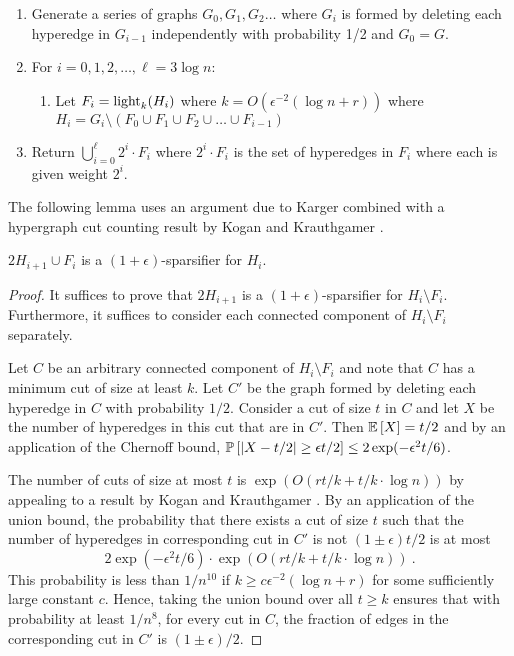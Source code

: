 \begin{enumerate}
\item Generate a series of graphs $G_0, G_1, G_2\ldots $ where $G_i$ is formed by deleting each hyperedge in $G_{i-1}$ independently with probability 1/2 and $G_0=G$.
\item For $i=0,1,2,\ldots, \ell=3\log n$:
\begin{enumerate}
\item Let $F_i=\operatorname{{light}}_k(H_i)$ where $k=O(\epsilon^{-2} ( \log n + r))$ where 
$H_i=G_i \setminus (F_0\cup F_1 \cup F_2 \cup \ldots \cup F_{i-1})$
\end{enumerate}
\item Return $\bigcup_{i=0}^\ell 2^i \cdot F_i $ where $2^i \cdot F_i$ is the set of hyperedges in $F_i$ where each is given weight $2^i$.
\end{enumerate}

 The following lemma uses an argument due to Karger \cite{karger1994} combined with a hypergraph cut counting result by Kogan and Krauthgamer \cite{KoganK14}.

\begin{lemma}\label{lem:onestep}
$2 H_{i+1} \cup F_i$ is a $(1+\epsilon)$-sparsifier for $H_i$.
\end{lemma} 
\begin{proof}
It suffices to prove that $2 H_{i+1}$ is a $(1+\epsilon)$-sparsifier for $H_i\setminus F_i$. Furthermore, it suffices to consider each connected component of $H_i\setminus F_i$ separately. 

Let $C$ be an arbitrary connected component of $H_i\setminus F_i$ and note that $C$ has a minimum cut of size at least $k$. Let $C'$ be the graph formed by deleting each hyperedge in $C$ with probability $1/2$. Consider a cut of size $t$ in $C$ and let $X$ be the number of hyperedges in this cut that are in $C'$. Then $\mathbb E\left [ X \right ]=t/2$ and by an application of the Chernoff bound,
$\mathbb P \left [ |X-t/2| \geq \epsilon t/2 \right ]\leq 2\exp(-\epsilon^2 t/6)
$.

The number of cuts of size at most $t$ is $\exp(O(rt/k+ t/k \cdot \log n))$  by appealing to a result by Kogan and Krauthgamer \cite{KoganK14}. By an application of the union bound, the probability that there exists a cut of  size $t$ such that the number of hyperedges in corresponding cut in $C'$ is not $(1\pm \epsilon)t/2$ is at most 
\[2\exp(-\epsilon^2 t/6) \cdot \exp(O(rt/k+ t/k \cdot \log n)) \ .\]
This probability is less than $1/n^{10}$
if $k\geq c\epsilon^{-2} (\log n + r)$ for some sufficiently large constant $c$. Hence, taking the union bound over all $t\geq k$ ensures that with probability at least $1/n^8$, for every cut in $C$, the fraction of edges in the corresponding cut in $C'$ is $(1\pm \epsilon)/2$.
\end{proof}

